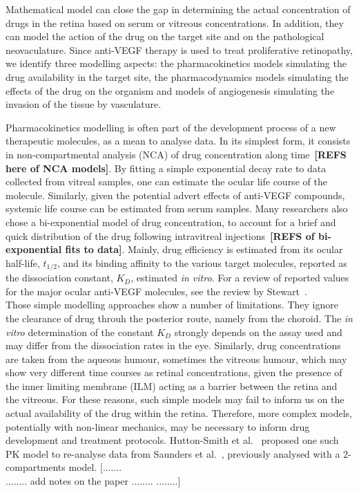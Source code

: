 \documentclass[12pt,a4paper]{article}
\begin{document}
Mathematical model can close the gap in determining the actual concentration of drugs in the retina based on serum or vitreous concentrations.
In addition, they can model the action of the drug on the target site and on the pathological neovaculature.
Since anti-VEGF therapy is used to treat proliferative retinopathy, we identify three modelling aspects: the pharmacokinetics models simulating the drug availability in the target site, the pharmacodynamics models simulating the effects of the drug on the organism and models of angiogenesis simulating the invasion of the tissue by vasculature.

Pharmacokinetics modelling is often part of the development process of a new therapeutic molecules, as a mean to analyse data.
In its simplest form, it consists in non-compartmental analysis (NCA) of drug concentration along time~\textbf{[REFS here of NCA models]}.
By fitting a simple exponential decay rate to data collected from vitreal samples, one can estimate the ocular life course of the molecule.
Similarly, given the potential advert effects of anti-VEGF compounds, systemic life course can be estimated from serum samples.
Many researchers also chose a bi-exponential model of drug concentration, to account for a brief and quick distribution of the drug following intravitreal injections~\textbf{[REFS of bi-exponential fits to data]}.
Mainly, drug efficiency is estimated from its ocular half-life, $t_{1/2}$, and its binding affinity to the various target molecules, reported as the dissociation constant, $K_D$, estimated \textit{in vitro}.
For a review of reported values for the major ocular anti-VEGF molecules, see the review by Stewart~\cite{stewart_pharmacokinetics_2014}.\\
Those simple modelling approaches show a number of limitations.
They ignore the clearance of drug throuh the posterior route, namely from the choroid.
The \textit{in vitro} determination of the constant $K_D$ strongly depends on the assay used and may differ from the dissociation rates in the eye.
Similarly, drug concentrations are taken from the aqueous humour, sometimes the vitreous humour, which may show very different time courses as retinal concentrations, given the presence of the inner limiting membrane (ILM) acting as a barrier between the retina and the vitreous.
For these reasons, such simple models may fail to inform us on the actual availability of the drug within the retina.
Therefore, more complex models, potentially with non-linear mechanics, may be necessary to inform drug development and treatment protocols.
Hutton-Smith et al.~\cite{hutton-smith_ocular_2017} proposed one such PK model to re-analyse data from Saunders et al.~\cite{saunders_model_2015}, previously analysed with a 2-compartments model.
[.......\\
........
add notes on the paper
........
........]
\end{document}
